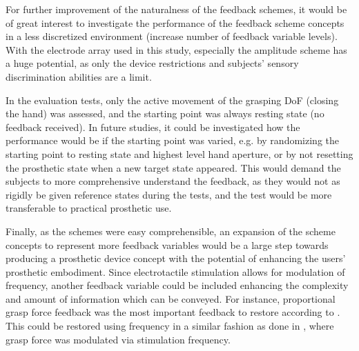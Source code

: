 For further improvement of the naturalness of the feedback schemes, it would be of great interest to investigate the performance of the feedback scheme concepts in a less discretized environment (increase number of feedback variable levels). With the electrode array used in this study, especially the amplitude scheme has a huge potential, as only the device restrictions and subjects' sensory discrimination abilities are a limit.

In the evaluation tests, only the active movement of the grasping DoF (closing the hand) was assessed, and the starting point was always resting state (no feedback received). In future studies, it could be investigated how the performance would be if the starting point was varied, e.g. by randomizing the starting point to resting state and highest level hand aperture, or by not resetting the prosthetic state when a new target state appeared. This would demand the subjects to more comprehensive understand the feedback, as they would not as rigidly be given reference states during the tests, and the test would be more transferable to practical prosthetic use.

Finally, as the schemes were easy comprehensible, an expansion of the scheme concepts to represent more feedback variables would be a large step towards producing a prosthetic device concept with the potential of enhancing the users' prosthetic embodiment. Since electrotactile stimulation allows for modulation of frequency, another feedback variable could be included enhancing the complexity and amount of information which can be conveyed. For instance, proportional grasp force feedback was the most important feedback to restore according to \cite{Peerdeman2011}. This could be restored using frequency in a similar fashion as done in \cite{Dosen2016}, where grasp force was modulated via stimulation frequency. 
 



